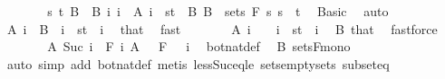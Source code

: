 \begin{isabellebody}
\ \ \ \ \isamarkupfalse%
\ \isamarkupfalse%
\ s\ t\ B\ \ B{\isacharcolon}{\kern0pt}\ {\isachardoublequoteopen}{\isacharparenleft}{\kern0pt}{\isasymUnion}i{\isachardot}{\kern0pt}\ {\isacharbraceleft}{\kern0pt}i{\isacharbraceright}{\kern0pt}\ {\isasymtimes}\ A\ i{\isacharparenright}{\kern0pt}\ {\isacharequal}{\kern0pt}\ {\isacharbraceleft}{\kern0pt}s{\isacharless}{\kern0pt}{\isachardot}{\kern0pt}{\isachardot}{\kern0pt}t{\isacharbraceright}{\kern0pt}\ {\isasymtimes}\ B{\isachardoublequoteclose}\ {\isachardoublequoteopen}B\ {\isasymin}\ sets\ {\isacharparenleft}{\kern0pt}F\ s{\isacharparenright}{\kern0pt}{\isachardoublequoteclose}\ {\isachardoublequoteopen}s\ {\isacharless}{\kern0pt}\ t{\isachardoublequoteclose}\ \isamarkupfalse%
\ Basic\ \isamarkupfalse%
\ auto\isanewline
\ \ \ \ \isamarkupfalse%
\ {\isachardoublequoteopen}A\ i\ {\isacharequal}{\kern0pt}\ B{\isachardoublequoteclose}\ \ {\isachardoublequoteopen}i\ {\isasymin}\ {\isacharbraceleft}{\kern0pt}s{\isacharless}{\kern0pt}{\isachardot}{\kern0pt}{\isachardot}{\kern0pt}t{\isacharbraceright}{\kern0pt}{\isachardoublequoteclose}\ \ i\ \isamarkupfalse%
\ that\ \isamarkupfalse%
\ fast\isanewline
\ \ \ \ \isamarkupfalse%
\ \isamarkupfalse%
\ {\isachardoublequoteopen}A\ i\ {\isacharequal}{\kern0pt}\ {\isacharbraceleft}{\kern0pt}{\isacharbraceright}{\kern0pt}{\isachardoublequoteclose}\ \ {\isachardoublequoteopen}i\ {\isasymnotin}\ {\isacharbraceleft}{\kern0pt}s{\isacharless}{\kern0pt}{\isachardot}{\kern0pt}{\isachardot}{\kern0pt}t{\isacharbraceright}{\kern0pt}{\isachardoublequoteclose}\ \ i\ \isamarkupfalse%
\ B\ that\ \isamarkupfalse%
\ fastforce\isanewline
\ \ \ \ \isamarkupfalse%
\ \isamarkupfalse%
\ {\isachardoublequoteopen}A\ {\isacharparenleft}{\kern0pt}Suc\ i{\isacharparenright}{\kern0pt}\ {\isasymin}\ F\ i{\isachardoublequoteclose}\ {\isachardoublequoteopen}A\ {}\ {\isasymin}\ F\ {}{\isachardoublequoteclose}\ \ i\ \isamarkupfalse%
\ bot{\isacharunderscore}{\kern0pt}nat{\isacharunderscore}{\kern0pt}def\ \isamarkupfalse%
\ B\ sets{\isacharunderscore}{\kern0pt}F{\isacharunderscore}{\kern0pt}mono\ \isamarkupfalse%
\ {\isacharparenleft}{\kern0pt}auto\ simp\ add{\isacharcolon}{\kern0pt}\ bot{\isacharunderscore}{\kern0pt}nat{\isacharunderscore}{\kern0pt}def{\isacharparenright}{\kern0pt}\ {\isacharparenleft}{\kern0pt}metis\ less{\isacharunderscore}{\kern0pt}Suc{\isacharunderscore}{\kern0pt}eq{\isacharunderscore}{\kern0pt}le\ sets{\isachardot}{\kern0pt}empty{\isacharunderscore}{\kern0pt}sets\ subset{\isacharunderscore}{\kern0pt}eq{\isacharparenright}{\kern0pt}\isanewline

\end{isabellebody}
